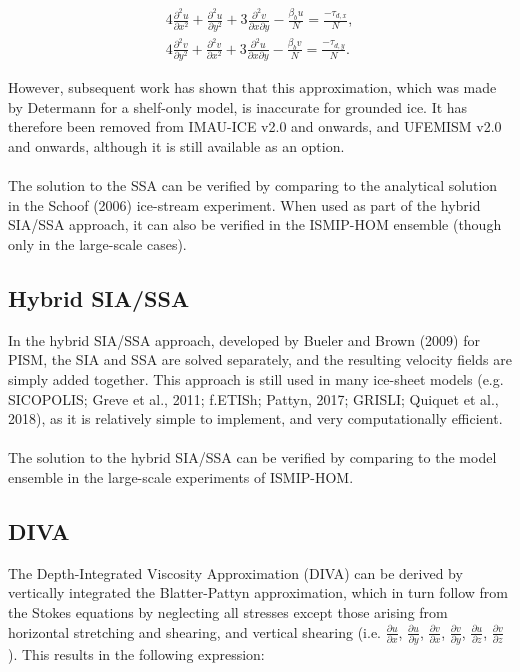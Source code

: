 \documentclass{article}
\begin{document}
\begin{align} \label{eq:SSA_03}
4 \frac{\partial^2 u}{\partial x^2} + \frac{\partial^2 u}{\partial y^2} + 3 \frac{\partial^2 v}{\partial x \partial y}
- \frac{\beta_b u}{N} = \frac{-\tau_{d,x}}{N}, \\
4 \frac{\partial^2 v}{\partial y^2} + \frac{\partial^2 v}{\partial x^2} + 3 \frac{\partial^2 u}{\partial x \partial y}
- \frac{\beta_b v}{N} = \frac{-\tau_{d,y}}{N}.
\end{align}

However, subsequent work has shown that this approximation, which was made by Determann for a shelf-only model, is inaccurate for grounded ice. It has therefore been removed from IMAU-ICE v2.0 and onwards, and UFEMISM v2.0 and onwards, although it is still available as an option.\\
\\
The solution to the SSA can be verified by comparing to the analytical solution in the Schoof (2006) ice-stream experiment. When used as part of the hybrid SIA/SSA approach, it can also be verified in the ISMIP-HOM ensemble (though only in the large-scale cases).

\subsection{Hybrid SIA/SSA}

In the hybrid SIA/SSA approach, developed by Bueler and Brown (2009) for PISM, the SIA and SSA are solved separately, and the resulting velocity fields are simply added together. This approach is still used in many ice-sheet models (e.g. SICOPOLIS; Greve et al., 2011; f.ETISh; Pattyn, 2017; GRISLI; Quiquet et al., 2018), as it is relatively simple to implement, and very computationally efficient.\\
\\
The solution to the hybrid SIA/SSA can be verified by comparing to the model ensemble in the large-scale experiments of ISMIP-HOM.

\subsection{DIVA}

The Depth-Integrated Viscosity Approximation (DIVA) can be derived by vertically integrated the Blatter-Pattyn approximation, which in turn follow from the Stokes equations by neglecting all stresses except those arising from horizontal stretching and shearing, and vertical shearing (i.e. $\frac{\partial u}{\partial x}$, $\frac{\partial u}{\partial y}$, $\frac{\partial v}{\partial x}$, $\frac{\partial v}{\partial y}$, $\frac{\partial u}{\partial z}$, $\frac{\partial v}{\partial z}$). This results in the following expression:
\end{document}
